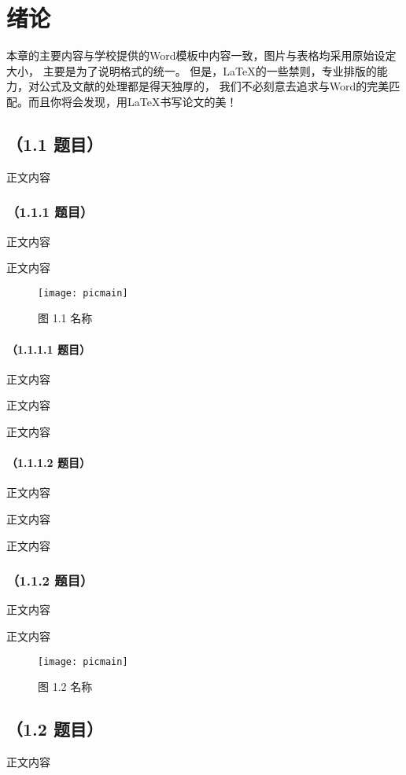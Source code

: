 \chapter{绪论}

本章的主要内容与学校提供的Word模板中内容一致，图片与表格均采用原始设定大小，%
主要是为了说明格式的统一。%
但是，\LaTeX{}的一些禁则，专业排版的能力，对公式及文献的处理都是得天独厚的，%
我们不必刻意去追求与Word的完美匹配。而且你将会发现，用\LaTeX{}书写论文的美！ %

\section{（1.1 题目）}
正文内容

\subsection{（1.1.1 题目）}
正文内容

正文内容

\begin{figure}[htp]
	\centering
	\texttt{[image: picmain]}
	\caption{图 1.1 名称}
\end{figure}

\subsubsection{（1.1.1.1 题目）}
正文内容

正文内容

正文内容

\subsubsection{（1.1.1.2 题目）}
正文内容

正文内容

正文内容

\subsection{（1.1.2 题目）}
正文内容

正文内容

\begin{figure}[htp]
	\centering
	\texttt{[image: picmain]}
	\caption{图 1.2 名称}
\end{figure}

\section{（1.2 题目）}
正文内容


